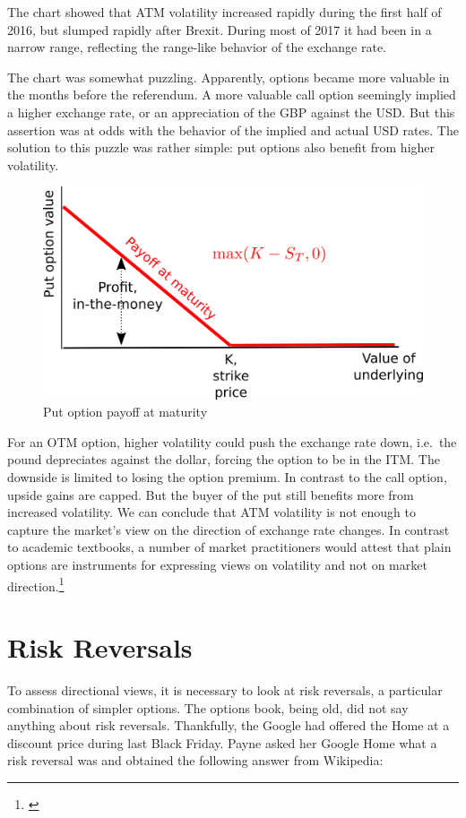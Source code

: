 \documentclass[]{book}
\let\rmarkdownfootnote\footnote%
\def\footnote{\protect\rmarkdownfootnote}
\theoremstyle{definition}
\theoremstyle{definition}
\theoremstyle{definition}
\theoremstyle{remark}
\begin{document}
The chart showed that ATM volatility increased rapidly during the first
half of 2016, but slumped rapidly after Brexit. During most of 2017 it
had been in a narrow range, reflecting the range-like behavior of the
exchange rate.

The chart was somewhat puzzling. Apparently, options became more
valuable in the months before the referendum. A more valuable call
option seemingly implied a higher exchange rate, or an appreciation of
the GBP against the USD. But this assertion was at odds with the
behavior of the implied and actual USD rates. The solution to this
puzzle was rather simple: put options also benefit from higher
volatility.

\begin{figure}
\includegraphics[width=0.7\linewidth]{images/figPUtOptionMaturity} \caption{Put option payoff at maturity}\label{fig:unnamed-chunk-13}
\end{figure}

For an OTM option, higher volatility could push the exchange rate down,
i.e.~the pound depreciates against the dollar, forcing the option to be
in the ITM. The downside is limited to losing the option premium. In
contrast to the call option, upside gains are capped. But the buyer of
the put still benefits more from increased volatility. We can conclude
that ATM volatility is not enough to capture the market's view on the
direction of exchange rate changes. In contrast to academic textbooks, a
number of market practitioners would attest that plain options are
instruments for expressing views on volatility and not on market
direction.\footnote{\citet{Derman-Miller2016}}

\section{Risk Reversals}\label{risk-reversals}

To assess directional views, it is necessary to look at risk reversals,
a particular combination of simpler options. The options book, being
old, did not say anything about risk reversals. Thankfully, the Google
had offered the Home at a discount price during last Black Friday. Payne
asked her Google Home what a risk reversal was and obtained the
following answer from Wikipedia:
\end{document}
